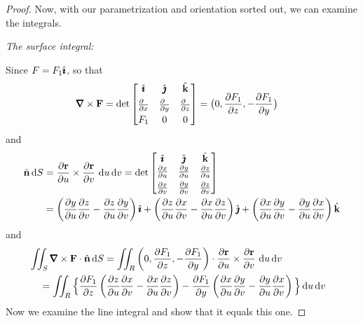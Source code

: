 \begin{proof}
Now, with our parametrization and orientation sorted out, we can examine
the integrals.

\bigskip
\noindent
\emph{The surface integral:}\ \ \

Since $F=F_1\hat{\pmb{\imath}}$, so that 
\begin{align*}
\vnabla\times\vF
&=\det\left[\begin{matrix} \hi & \hj & \hk \\[0.05in]
         \frac{\partial\hfill}{\partial x} & \frac{\partial\hfill}{\partial y} &
                         \frac{\partial\hfill}{\partial z} \\[0.05in]
         F_1 & 0 & 0
       \end{matrix}\right] 
= \big(0,\frac{\partial F_1}{\partial z}, 
                -\frac{\partial F_1}{\partial y}\big)
\end{align*}
and 
\begin{align*}
\hat{\mathbf{n}}\,\mathrm{d}S
&=\frac{\partial \mathbf{r}}{\partial u} \times \frac{\partial \mathbf{r}}{\partial v}
         \ \mathrm{d}u\,\mathrm{d}v 
=\det\left[\begin{matrix} \hat{\pmb{\imath}} & \hat{\pmb{\jmath}} & \hat{\mathbf{k}} \\
         \frac{\partial x}{\partial u} & \frac{\partial y}{\partial u} &
                         \frac{\partial z}{\partial u} \\[0.05in]
         \frac{\partial x}{\partial v} & \frac{\partial y}{\partial v} &
                         \frac{\partial z}{\partial v}
       \end{matrix}\right] \\
&=\left(\frac{\partial y}{\partial u}
                         \frac{\partial z}{\partial v}
                       -\frac{\partial z}{\partial u}
                       \frac{\partial y}{\partial v}\right)\hat{\pmb{\imath}}
  + \left(\frac{\partial z}{\partial u}
                         \frac{\partial x}{\partial v}
                       -\frac{\partial x}{\partial u}
                       \frac{\partial z}{\partial v}\right)\hat{\pmb{\jmath}}
  +\left(\frac{\partial x}{\partial u}
                         \frac{\partial y}{\partial v}
                       -\frac{\partial y}{\partial u}
                       \frac{\partial x}{\partial v}\right) \hat{\mathbf{k}}
\end{align*}
and
\begin{align*}
&\dblInt_{S}\vnabla\times\vF\cdot\hn\,\dee{S}
=\dblInt_{R}\left(0,\frac{\partial F_1}{\partial z}, 
                -\frac{\partial F_1}{\partial y}\right)
   \cdot\frac{\partial \vr}{\partial u}
\times \frac{\partial \vr}{\partial v}\ \dee{u}\,\dee{v}\cr
&\hskip.15in=\dblInt_{R}\Big\{\frac{\partial F_1}{\partial z}
                    \left(\frac{\partial z}{\partial u}
                         \frac{\partial x}{\partial v}
                       -\frac{\partial x}{\partial u}
                       \frac{\partial z}{\partial v}\right)
-\frac{\partial F_1}{\partial y}
                    \left(\frac{\partial x}{\partial u}
                         \frac{\partial y}{\partial v}
                       -\frac{\partial y}{\partial u}
                       \frac{\partial x}{\partial v}\right)
\Big\}\,\dee{u}\,\dee{v}
\end{align*}
Now we examine the line integral and show that it equals this one.


\end{proof}
